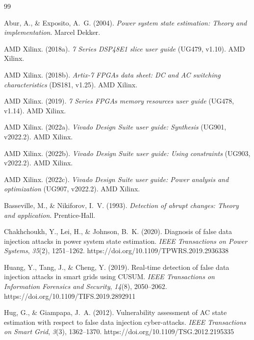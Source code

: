 \documentclass[11pt,a4paper]{report}
\begin{document}
\begin{thebibliography}{99}
\small
\setlength{\itemsep}{2pt}
\setlength{\parskip}{0pt}

Abur, A., \& Exposito, A.~G. (2004). \textit{Power system state estimation: Theory and implementation}. Marcel Dekker.

AMD Xilinx. (2018a). \textit{7 Series DSP48E1 slice user guide} (UG479, v1.10). AMD Xilinx.

AMD Xilinx. (2018b). \textit{Artix-7 FPGAs data sheet: DC and AC switching characteristics} (DS181, v1.25). AMD Xilinx.

AMD Xilinx. (2019). \textit{7 Series FPGAs memory resources user guide} (UG478, v1.14). AMD Xilinx.

AMD Xilinx. (2022a). \textit{Vivado Design Suite user guide: Synthesis} (UG901, v2022.2). AMD Xilinx.

AMD Xilinx. (2022b). \textit{Vivado Design Suite user guide: Using constraints} (UG903, v2022.2). AMD Xilinx.

AMD Xilinx. (2022c). \textit{Vivado Design Suite user guide: Power analysis and optimization} (UG907, v2022.2). AMD Xilinx.

Basseville, M., \& Nikiforov, I.~V. (1993). \textit{Detection of abrupt changes: Theory and application}. Prentice-Hall.

Chakhchoukh, Y., Lei, H., \& Johnson, B.~K. (2020). Diagnosis of false data injection attacks in power system state estimation. \textit{IEEE Transactions on Power Systems}, \textit{35}(2), 1251--1262. https://doi.org/10.1109/TPWRS.2019.2936338

Huang, Y., Tang, J., \& Cheng, Y. (2019). Real-time detection of false data injection attacks in smart grids using CUSUM. \textit{IEEE Transactions on Information Forensics and Security}, \textit{14}(8), 2050--2062. https://doi.org/10.1109/TIFS.2019.2892911

Hug, G., \& Giampapa, J.~A. (2012). Vulnerability assessment of AC state estimation with respect to false data injection cyber-attacks. \textit{IEEE Transactions on Smart Grid}, \textit{3}(3), 1362--1370. https://doi.org/10.1109/TSG.2012.2195335


\end{thebibliography}
\end{document}
